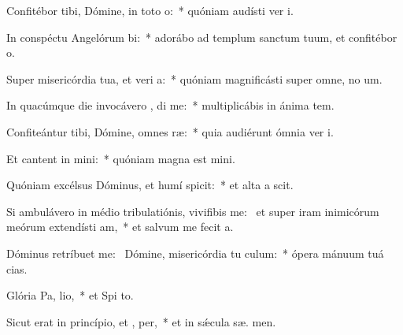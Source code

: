 \item Confitébor tibi, Dómine, in toto  o:~* quóniam audísti ver  i.
\item In conspéctu Angelórum  bi:~* adorábo ad templum sanctum tuum, et confitébor  o.
\item Super misericórdia tua, et veri a:~* quóniam magnificásti super omne, no  um.
\item In quacúmque die invocávero , di me:~* multiplicábis in ánima  tem.
\item Confiteántur tibi, Dómine, omnes  ræ:~* quia audiérunt ómnia ver  i.
\item Et cantent in  mini:~* quóniam magna est  mini.
\item Quóniam excélsus Dóminus, et humí spicit:~* et alta a  scit.
\item Si ambulávero in médio tribulatiónis, vivifibis me:~\pscross{} et super iram inimicórum meórum extendísti  am,~* et salvum me fecit  a.
\item Dóminus retríbuet  me:~\pscross{} Dómine, misericórdia tu  culum:~* ópera mánuum tuá  cias.
\item Glória Pa,  lio,~* et Spi to.
\item Sicut erat in princípio, et ,  per,~* et in sǽcula sæ. men.
